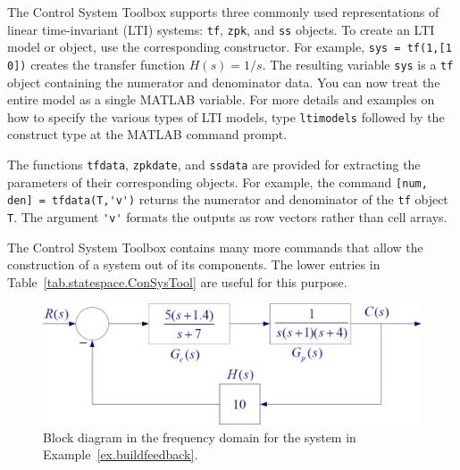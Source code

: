 The Control System Toolbox supports three commonly used representations of linear time-invariant (LTI) systems: \verb=tf=, \verb=zpk=, and \verb=ss= objects.  To create an LTI model or object, use the corresponding constructor. For example, \verb#sys = tf(1,[1 0])# creates the transfer function $H(s) = 1/s$.  The resulting variable \verb=sys= is a \verb=tf= object containing the numerator and denominator data.  You can now treat the entire model as a single MATLAB variable.  For more details and examples on how to specify the various types of LTI models, type \verb=ltimodels= followed by the construct type at the MATLAB command prompt.
\par
The functions \verb=tfdata=, \verb=zpkdate=, and \verb=ssdata= are provided for extracting the parameters of their corresponding objects.  For example, the command \verb#[num, den] = tfdata(T,'v')# returns the numerator and denominator of the \verb=tf= object \verb=T=.  The argument \verb='v'= formats the outputs as row vectors rather than cell arrays.
\par
The Control System Toolbox contains many more commands that allow the construction of a system out of its components.  The lower entries in Table~\ref{tab.statespace.ConSysTool} are useful for this purpose.

\begin{figure}[thb]
\centering
\includegraphics[width=.8\textwidth]{buildfeedback}
\caption{\footnotesize
        Block diagram in the frequency domain for the system in Example~\ref{ex.buildfeedback}.
        \label{fig.statespace.buildfeedback}
        }
\end{figure}

